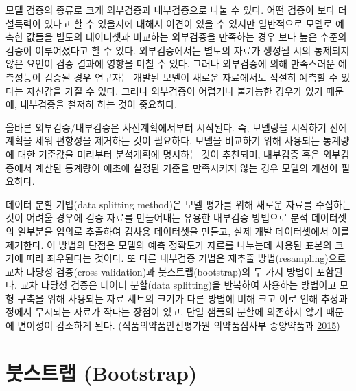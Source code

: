 \documentclass[
  10pt,
  krantz2,
  a4paper]{krantz}
\theoremstyle{definition}
\theoremstyle{definition}
\theoremstyle{definition}
\theoremstyle{remark}
\begin{document}

모델 검증의 종류로 크게 외부검증과 내부검증으로 나눌 수 있다. 어떤 검증이 보다 더 설득력이 있다고 할 수 있을지에 대해서 이견이 있을 수 있지만 일반적으로 모델로 예측한 값들을 별도의 데이터셋과 비교하는 외부검증을 만족하는 경우 보다 높은 수준의 검증이 이루어졌다고 할 수 있다. 외부검증에서는 별도의 자료가 생성될 시의 통제되지 않은 요인이 검증 결과에 영향을 미칠 수 있다. 그러나 외부검증에 의해 만족스러운 예측성능이 검증될 경우 연구자는 개발된 모델이 새로운 자료에서도 적절히 예측할 수 있다는 자신감을 가질 수 있다. 그러나 외부검증이 어렵거나 불가능한 경우가 있기 때문에, 내부검증을 철저히 하는 것이 중요하다.

올바른 외부검증/내부검증은 사전계획에서부터 시작된다. 즉, 모델링을 시작하기 전에 계획을 세워 편향성을 제거하는 것이 필요하다. 모델을 비교하기 위해 사용되는 통계량에 대한 기준값을 미리부터 분석계획에 명시하는 것이 추천되며, 내부검증 혹은 외부검증에서 계산된 통계량이 애초에 설정된 기준을 만족시키지 않는 경우 모델의 개선이 필요하다.

데이터 분할 기법(data splitting method)은 모델 평가를 위해 새로운 자료를 수집하는 것이 어려울 경우에 검증 자료를 만들어내는 유용한 내부검증 방법으로 분석 데이터셋의 일부분을 임의로 추출하여 검사용 데이터셋을 만들고, 실제 개발 데이터셋에서 이를 제거한다. 이 방법의 단점은 모델의 예측 정확도가 자료를 나누는데 사용된 표본의 크기에 따라 좌우된다는 것이다. 또 다른 내부검증 기법은 재추출 방법(resampling)으로 교차 타당성 검증(cross-validation)과 붓스트랩(bootstrap)의 두 가지 방법이 포함된다. 교차 타당성 검증은 데어터 분할(data splitting)을 반복하여 사용하는 방법이고 모형 구축을 위해 사용되는 자료 세트의 크기가 다른 방법에 비해 크고 이로 인해 추정과정에서 무시되는 자료가 작다는 장점이 있고, 단일 샘플의 분할에 의존하지 않기 때문에 변이성이 감소하게 된다. (식품의약품안전평가원 의약품심사부 종양약품과 \protect\hyperlink{ref-poppk}{2015})

\hypertarget{uxbd93uxc2a4uxd2b8uxb7a9-bootstrap}{%
\section{\texorpdfstring{붓스트랩 (Bootstrap)}{붓스트랩 (Bootstrap)}}\label{uxbd93uxc2a4uxd2b8uxb7a9-bootstrap}}
\end{document}
